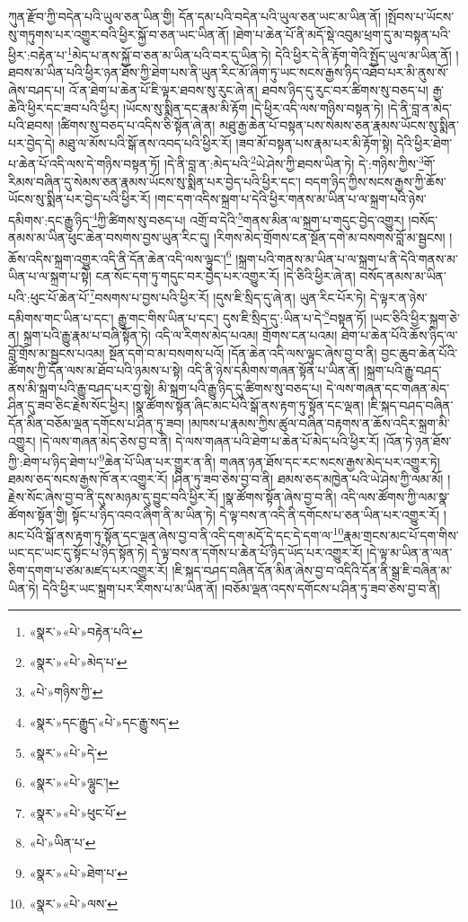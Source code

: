 ཀུན་རྫོབ་ཀྱི་བདེན་པའི་ཡུལ་ཅན་ཡིན་གྱི། དོན་དམ་པའི་བདེན་པའི་ཡུལ་ཅན་ཡང་མ་ཡིན་ནོ། །སྤོབས་པ་ཡོངས་སུ་གཏུགས་པར་འགྱུར་བའི་ཕྱིར་སྐྱོ་བ་ཅན་ཡང་ཡིན་ནོ། །ཐེག་པ་ཆེན་པོ་ནི་མདོ་སྡེ་འབུམ་ཕྲག་དུ་མ་བསྟན་པའི་ཕྱིར་:བརྟེན་པ་\footnote{«སྣར་»«པེ་»བརྟེན་པའི་}མེད་པ་ནས་སྐྱོ་བ་ཅན་མ་ཡིན་པའི་བར་དུ་ཡིན་ཏེ། དེའི་ཕྱིར་དེ་ནི་རྟོག་གེའི་སྤྱོད་ཡུལ་མ་ཡིན་ནོ། །ཐབས་མ་ཡིན་པའི་ཕྱིར་ཉན་ཐོས་ཀྱི་ཐེག་པས་ནི་ཡུན་རིང་མོ་ཞིག་ཏུ་ཡང་སངས་རྒྱས་ཉིད་འཐོབ་པར་མི་ནུས་སོ་ཞེས་བཤད་པ། འོ་ན་ཐེག་པ་ཆེན་པོ་ཇི་ལྟར་ཐབས་སུ་རུང་ཞེ་ན། ཐབས་ཉིད་དུ་རུང་བར་ཚིགས་སུ་བཅད་པ། རྒྱ་ཆེའི་ཕྱིར་དང་ཟབ་པའི་ཕྱིར། །ཡོངས་སུ་སྨིན་དང་རྣམ་མི་རྟོག །དེ་ཕྱིར་འདི་ལས་གཉིས་བསྟན་ཏེ། །དེ་ནི་བླ་ན་མེད་པའི་ཐབས། །ཚིགས་སུ་བཅད་པ་འདིས་ཅི་སྟོན་ཞེ་ན། མཐུ་རྒྱ་ཆེན་པོ་བསྟན་པས་སེམས་ཅན་རྣམས་ཡོངས་སུ་སྨིན་པར་བྱེད་དེ། མཐུ་ལ་མོས་པའི་སྒོ་ནས་འབད་པའི་ཕྱིར་རོ། །ཟབ་མོ་བསྟན་པས་རྣམ་པར་མི་རྟོག་སྟེ། དེའི་ཕྱིར་ཐེག་པ་ཆེན་པོ་འདི་ལས་དེ་གཉིས་བསྟན་ཏོ། །དེ་ནི་བླ་ན་:མེད་པའི་\footnote{«སྣར་»«པེ་»མེད་པ་}ཡེ་ཤེས་ཀྱི་ཐབས་ཡིན་ཏེ། དེ་:གཉིས་ཀྱིས་\footnote{«པེ་»གཉིས་ཀྱི་}གོ་རིམས་བཞིན་དུ་སེམས་ཅན་རྣམས་ཡོངས་སུ་སྨིན་པར་བྱེད་པའི་ཕྱིར་དང་། བདག་ཉིད་ཀྱིས་སངས་རྒྱས་ཀྱི་ཆོས་ཡོངས་སུ་སྨིན་པར་བྱེད་པའི་ཕྱིར་རོ། །གང་དག་འདིས་སྐྲག་པ་དེའི་ཕྱིར་གནས་མ་ཡིན་པ་ལ་སྐྲག་པའི་ཉེས་དམིགས་:དང་རྒྱུ་ཉིད་\footnote{«སྣར་»དང་རྒྱུད་«པེ་»དང་རྒྱུ་སད་}ཀྱི་ཚིགས་སུ་བཅད་པ། འགྲོ་བ་དེའི་\footnote{«སྣར་»«པེ་»དེ་}གནས་མིན་ལ་སྐྲག་པ་གདུང་བྱེད་འགྱུར། །བསོད་ནམས་མ་ཡིན་ཕུང་ཆེན་བསགས་བྱས་ཡུན་རིང་དུ། །རིགས་མེད་གྲོགས་ངན་སྔོན་དགེ་མ་བསགས་བློ་མ་སྦྱངས། །ཆོས་འདིས་སྐྲག་འགྱུར་འདི་ནི་དོན་ཆེན་འདི་ལས་ལྟུང་།\footnote{«སྣར་»«པེ་»ལྷུང་།} །སྐྲག་པའི་གནས་མ་ཡིན་པ་ལ་སྐྲག་པ་ནི་དེའི་གནས་མ་ཡིན་པ་ལ་སྐྲག་པ་སྟེ། ངན་སོང་དག་ཏུ་གདུང་བར་བྱེད་པར་འགྱུར་རོ། །དེ་ཅིའི་ཕྱིར་ཞེ་ན། བསོད་ནམས་མ་ཡིན་པའི་:ཕུང་པོ་ཆེན་པོ་\footnote{«སྣར་»«པེ་»ཕུང་པོ་}བསགས་པ་བྱས་པའི་ཕྱིར་རོ། །དུས་ཇི་སྲིད་དུ་ཞེ་ན། ཡུན་རིང་པོར་ཏེ། དེ་ལྟར་ན་ཉེས་དམིགས་གང་ཡིན་པ་དང་། རྒྱུ་གང་གིས་ཡིན་པ་དང་། དུས་ཇི་སྲིད་དུ་:ཡིན་པ་དེ་\footnote{«པེ་»ཡིན་པ་}བསྟན་ཏོ། །ཡང་ཅིའི་ཕྱིར་སྐྲག་ཅེ་ན། སྐྲག་པའི་རྒྱུ་རྣམ་པ་བཞི་སྟོན་ཏེ། འདི་ལ་རིགས་མེད་པའམ། གྲོགས་ངན་པའམ། ཐེག་པ་ཆེན་པོའི་ཆོས་ཉིད་ལ་བློ་གྲོས་མ་སྦྱངས་པའམ། སྔོན་དགེ་བ་མ་བསགས་པའོ། །དོན་ཆེན་འདི་ལས་ལྟུང་ཞེས་བྱ་བ་ནི། བྱང་ཆུབ་ཆེན་པོའི་ཚོགས་ཀྱི་དོན་ལས་མ་ཐོབ་པའི་ཉམས་པ་སྟེ། འདི་ནི་ཉེས་དམིགས་གཞན་སྟོན་པ་ཡིན་ནོ། །སྐྲག་པའི་རྒྱུ་བཤད་ནས་མི་སྐྲག་པའི་རྒྱུ་བཤད་པར་བྱ་སྟེ། མི་སྐྲག་པའི་རྒྱུ་ཉིད་དུ་ཚིགས་སུ་བཅད་པ། དེ་ལས་གཞན་དང་གཞན་མེད་ཤིན་དུ་ཟབ་ཅིང་རྗེས་སོང་ཕྱིར། །སྣ་ཚོགས་སྟོན་ཞིང་མང་པོའི་སྒོ་ནས་རྟག་ཏུ་སྟོན་དང་ལྡན། །ཇི་སྐད་བཤད་བཞིན་དོན་མིན་བཅོམ་ལྡན་དགོངས་པ་ཤིན་ཏུ་ཟབ། །མཁས་པ་རྣམས་ཀྱིས་ཚུལ་བཞིན་བརྟགས་ན་ཆོས་འདིར་སྐྲག་མི་འགྱུར། །དེ་ལས་གཞན་མེད་ཅེས་བྱ་བ་ནི། དེ་ལས་གཞན་པའི་ཐེག་པ་ཆེན་པོ་མེད་པའི་ཕྱིར་རོ། །འོན་ཏེ་ཉན་ཐོས་ཀྱི་:ཐེག་པ་ཉིད་ཐེག་པ་\footnote{«སྣར་»«པེ་»ཐེག་པ་}ཆེན་པོ་ཡིན་པར་གྱུར་ན་ནི། གཞན་ཉན་ཐོས་དང་རང་སངས་རྒྱས་མེད་པར་འགྱུར་ཏེ། ཐམས་ཅད་སངས་རྒྱས་ཁོ་ནར་འགྱུར་རོ། །ཤིན་ཏུ་ཟབ་ཅེས་བྱ་བ་ནི། ཐམས་ཅད་མཁྱེན་པའི་ཡེ་ཤེས་ཀྱི་ལམ་མོ། །རྗེས་སོང་ཞེས་བྱ་བ་ནི་དུས་མཉམ་དུ་བྱུང་བའི་ཕྱིར་རོ། །སྣ་ཚོགས་སྟོན་ཞེས་བྱ་བ་ནི། འདི་ལས་ཚོགས་ཀྱི་ལམ་སྣ་ཚོགས་སྟོན་གྱི། སྟོང་པ་ཉིད་འབའ་ཞིག་ནི་མ་ཡིན་ཏེ། དེ་ལྟ་བས་ན་འདི་ནི་དགོངས་པ་ཅན་ཡིན་པར་འགྱུར་རོ། །མང་པོའི་སྒོ་ནས་རྟག་ཏུ་སྟོན་དང་ལྡན་ཞེས་བྱ་བ་ནི་འདི་དག་མདོ་དེ་དང་དེ་དག་ལ་\footnote{«སྣར་»«པེ་»ལས་}རྣམ་གྲངས་མང་པོ་དག་གིས་ཡང་དང་ཡང་དུ་སྟོང་པ་ཉིད་སྟོན་ཏེ། དེ་ལྟ་བས་ན་དགོས་པ་ཆེན་པོ་ཉིད་ཡོད་པར་འགྱུར་རོ། །དེ་ལྟ་མ་ཡིན་ན་ལན་ཅིག་དགག་པ་ཙམ་མཛད་པར་འགྱུར་རོ། །ཇི་སྐད་བཤད་བཞིན་དོན་མིན་ཞེས་བྱ་བ་འདིའི་དོན་ནི་སྒྲ་ཇི་བཞིན་མ་ཡིན་ཏེ། དེའི་ཕྱིར་ཡང་སྐྲག་པར་རིགས་པ་མ་ཡིན་ནོ། །བཅོམ་ལྡན་འདས་དགོངས་པ་ཤིན་ཏུ་ཟབ་ཅེས་བྱ་བ་ནི། 